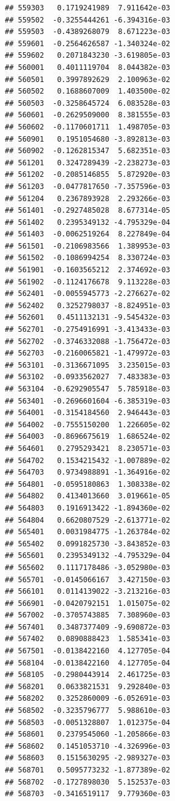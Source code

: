 \documentclass[ignorenonframetext,]{beamer}
\begin{document}
\begin{frame}[fragile]
\begin{verbatim}
## 559303   0.1719241989  7.911642e-03
## 559502  -0.3255444261 -6.394316e-03
## 559503  -0.4389268079  8.671223e-03
## 559601  -0.2564626587 -1.340324e-02
## 559602   0.2071843230 -3.619805e-03
## 560001   0.4011119704  8.044382e-03
## 560501   0.3997892629  2.100963e-02
## 560502   0.1688607009  1.403500e-02
## 560503  -0.3258645724  6.083528e-03
## 560601  -0.2629509000  8.381555e-03
## 560602  -0.1170601711  1.498705e-03
## 560901   0.1951054680 -3.892813e-03
## 560902  -0.1262815347  5.682351e-03
## 561201   0.3247289439 -2.238273e-03
## 561202  -0.2085146855  5.872920e-03
## 561203  -0.0477817650 -7.357596e-03
## 561204   0.2367893928  2.293266e-03
## 561401  -0.2927485028  8.677314e-05
## 561402   0.2395349132 -4.795329e-04
## 561403  -0.0062519264  8.227849e-04
## 561501  -0.2106983566  1.389953e-03
## 561502  -0.1086994254  8.330724e-03
## 561901  -0.1603565212  2.374692e-03
## 561902  -0.1124176678  9.113228e-03
## 562401  -0.0055945773 -2.276627e-02
## 562402   0.3252798037 -8.824951e-03
## 562601   0.4511132131 -9.545432e-03
## 562701  -0.2754916991 -3.413433e-03
## 562702  -0.3746332088 -1.756472e-03
## 562703  -0.2160065821 -1.479972e-03
## 563101  -0.3136671095  3.235015e-03
## 563102  -0.0933562027  7.483383e-03
## 563104  -0.6292905547  5.785918e-03
## 563401  -0.2696601604 -6.385319e-03
## 564001  -0.3154184560  2.946443e-03
## 564002  -0.7555150200  1.226605e-02
## 564003  -0.8696675619  1.686524e-02
## 564601   0.2795293421  8.230571e-03
## 564702   0.1534215432 -1.007889e-02
## 564703   0.9734988891 -1.364916e-02
## 564801  -0.0595180863  1.308338e-02
## 564802   0.4134013660  3.019661e-05
## 564803   0.1916913422 -1.894360e-02
## 564804   0.6620807529 -2.613771e-02
## 565401   0.0031984775 -1.263784e-02
## 565402   0.0991825730 -3.843852e-03
## 565601   0.2395349132 -4.795329e-04
## 565602   0.1117178486 -3.052980e-03
## 565701  -0.0145066167  3.427150e-03
## 566101   0.0114139022 -3.213216e-03
## 566901  -0.0420792151  1.015075e-02
## 567002  -0.3705743885  7.308960e-03
## 567401   0.3487377409 -9.690872e-03
## 567402   0.0890888423  1.585341e-03
## 567501  -0.0138422160  4.127705e-04
## 568104  -0.0138422160  4.127705e-04
## 568105  -0.2980443914  2.461725e-03
## 568201   0.0633821531  9.292840e-03
## 568202   0.3252860009 -6.052691e-03
## 568502  -0.3235796777  5.988610e-03
## 568503  -0.0051328807  1.012375e-04
## 568601   0.2379545060 -1.205866e-03
## 568602   0.1451053710 -4.326996e-03
## 568603   0.1515630295 -2.989327e-03
## 568701   0.5095773232 -1.877389e-02
## 568702  -0.1727898030  5.152537e-03
## 568703  -0.3416519117  9.779360e-03

\end{verbatim}
\end{frame}
\end{document}
